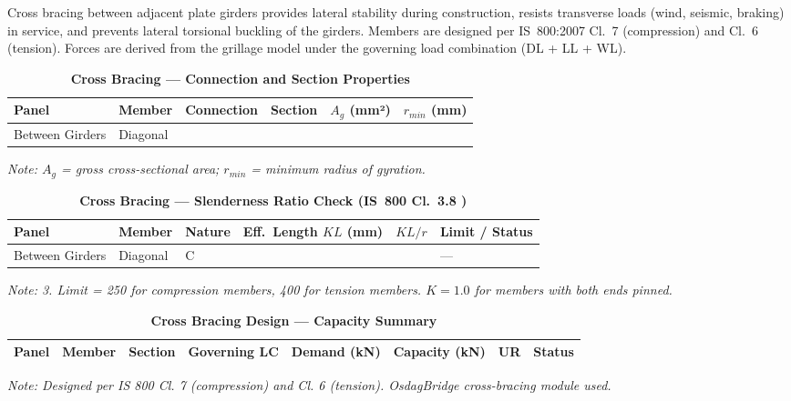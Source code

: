 \documentclass[12pt,a4paper]{report}
\numberwithin{table}{chapter}
\numberwithin{figure}{chapter}
\begin{document}
Cross bracing between adjacent plate girders provides lateral stability during construction, resists transverse loads (wind, seismic, braking) in service, and prevents lateral torsional buckling of the girders. Members are designed per IS~800:2007 Cl.~7 (compression) and Cl.~6 (tension). Forces are derived from the grillage model under the governing load combination  (DL + LL + WL).

\vspace{1em}

\vspace{0.4em}
\noindent
\setlength{\tabcolsep}{4pt}
\setlength\LTleft{0pt}
\setlength\LTright{\fill}

\begin{longtable}{|C{2.0cm}|L{2.0cm}|L{2.2cm}|C{2.5cm}|C{2.0cm}|C{2.0cm}|}
\caption{\textbf{Cross Bracing --- Connection and Section Properties}}\\
\hline
\textbf{Panel} & \textbf{Member} & \textbf{Connection} & \textbf{Section} & \textbf{$A_g$ (mm²)} & \textbf{$r_{min}$ (mm)} \\[6pt]
\hline
Between Girders & Diagonal &  &  &  &  \\[6pt]
\hline
\end{longtable}
\noindent\textit{Note: $A_g$ = gross cross-sectional area; $r_{min}$ = minimum radius of gyration.}

\vspace{1em}
\begin{longtable}{|C{2.2cm}|L{2.2cm}|L{2.5cm}|C{2.5cm}|C{2.5cm}|>{\centering\arraybackslash}p{3.6cm}|}
\caption{\textbf{Cross Bracing --- Slenderness Ratio Check (IS~800 Cl.~3.8 )}}\\
\hline
\textbf{Panel} & \textbf{Member} & \textbf{Nature} & \textbf{Eff.\ Length $KL$ (mm)} & \textbf{$KL/r$} & \textbf{Limit / Status} \\[6pt]
\hline
Between Girders & Diagonal & C &  &  &  ---  \\[6pt]
\hline
\end{longtable}
\noindent\textit{Note:  3. Limit = 250 for compression members, 400 for tension members. $K = 1.0$ for members with both ends pinned.}

\vspace{1em}
\begin{longtable}{|C{2.0cm}|L{1.8cm}|C{2.2cm}|C{3.0cm}|C{1.8cm}|C{1.8cm}|C{1.2cm}|C{1.8cm}|}
\caption{\textbf{Cross Bracing Design --- Capacity Summary}}\\
\hline
\textbf{Panel} & \textbf{Member} & \textbf{Section} & \textbf{Governing LC} & \textbf{Demand (kN)} & \textbf{Capacity (kN)} & \textbf{UR} & \textbf{Status} \\[6pt]
\hline

\end{longtable}
\noindent\textit{Note: Designed per IS 800 Cl. 7 (compression) and Cl. 6 (tension). OsdagBridge cross-bracing module used.}
\end{document}
